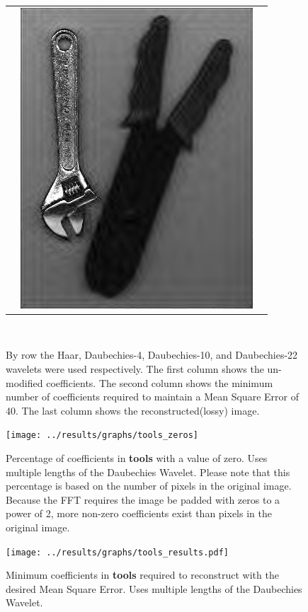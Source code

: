 \begin{figure}[hbt]
\begin{tabular}{ S @{} S @{} S }
		&	\includegraphics[height=0.25\textwidth]{../images/tools_d22_final} \\
	\end{tabular} \\
	\caption{By row the Haar, Daubechies-4, Daubechies-10, and Daubechies-22 wavelets were used 
					 respectively. The first
					 column shows the un-modified coefficients.  The second column shows the minimum number
					 of coefficients required to maintain a Mean Square Error of 40.
					 The last column shows the reconstructed(lossy) image.}
\end{figure}


\begin{figure}[hbt]
	\centering
	\label{fig:tools_zeros}
		\texttt{[image: ../results/graphs/tools\_zeros]}
	\caption{Percentage of coefficients in {\bf tools} with a value of zero. Uses multiple lengths of the Daubechies Wavelet.  Please note that this percentage is based on the number of pixels in the original image.  Because the FFT requires the image be padded with zeros to a power of 2, more non-zero coefficients exist than pixels in the original image.  }
\end{figure}
\begin{figure}[hbt]
	\centering
	\label{fig:tools_stats}
		\texttt{[image: ../results/graphs/tools\_results.pdf]}
	\caption{Minimum coefficients in {\bf tools} required to reconstruct with the desired Mean Square Error. Uses multiple lengths of the Daubechies Wavelet. }
\end{figure}





